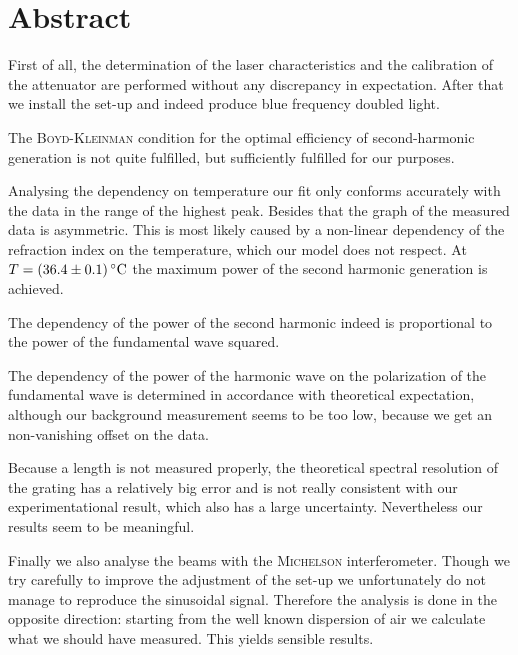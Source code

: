 \documentclass{protokoll_en}
\begin{document}
\section{Abstract}
First of all, the determination of the laser characteristics and the calibration of the attenuator are performed without any discrepancy in expectation. After that we install the set-up and indeed produce blue frequency doubled light.

The \textsc{Boyd-Kleinman} condition for the optimal efficiency of second-harmonic generation is not quite fulfilled, but sufficiently fulfilled for our purposes. 

Analysing the dependency on temperature our fit only conforms accurately with the data in the range of the highest peak. Besides that the graph of the measured data is asymmetric. This is most likely caused by a non-linear dependency of the refraction index on the temperature, which our model does not respect. At $T=\unit[(36.4 \pm 0.1)]{^\circ C}$ the maximum power of the second harmonic generation is achieved.

The dependency of the power of the second harmonic indeed is proportional to the power of the fundamental wave squared.

The dependency of the power of the harmonic wave on the polarization of the fundamental wave is determined in accordance with theoretical expectation, although our background measurement seems to be too low, because we get an non-vanishing offset on the data.

Because a length is not measured properly, the theoretical spectral resolution of the grating has a relatively big error and is not really consistent with our experimentational result, which also has a large uncertainty. Nevertheless our results seem to be meaningful.

Finally we also analyse the beams with the \textsc{Michelson} interferometer. Though we try carefully to improve the adjustment of the set-up we unfortunately do not manage to reproduce the sinusoidal signal. Therefore the analysis is done in the opposite direction: starting from the well known dispersion of air we calculate what we should have measured. This yields sensible results.
\end{document}
